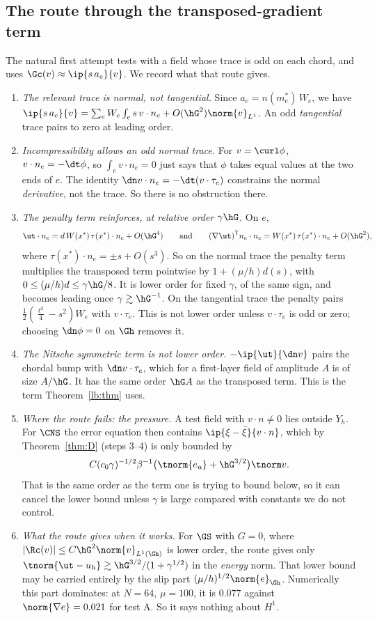 \subsection{The route through the transposed-gradient term}\label{lb:sec:route}
The natural first attempt tests with a field whose trace is odd on each chord, and uses $\Gc(v)\approx\ip{s\,a_e}{v}$. We record what that route gives.
\begin{enumerate}
\item \emph{The relevant trace is normal, not tangential.} Since $a_e=n(m_e^\ast)\,W_e$, we have $\ip{s\,a_e}{v}=\sum_eW_e\int_es\,v\cdot n_e+O(\hG^2)\norm{v}_{L^1}$. An odd \emph{tangential} trace pairs to zero at leading order.
\item \emph{Incompressibility allows an odd normal trace.} For $v=\curl\phi$, $v\cdot n_e=-\dt\phi$, so $\int_ev\cdot n_e=0$ just says that $\phi$ takes equal values at the two ends of $e$. The identity $\dn v\cdot n_e=-\dt(v\cdot\tau_e)$ constrains the normal \emph{derivative}, not the trace. So there is no obstruction there.
\item \emph{The penalty term reinforces, at relative order $\gamma\hG$.} On $e$,
\[
\ut\cdot n_e=d\,W(x^\ast)\,\tau(x^\ast)\cdot n_e+O(\hG^4)
\qquad\text{and}\qquad
(\nabla\ut)^{\mathsf T}n_e\cdot n_e=W(x^\ast)\,\tau(x^\ast)\cdot n_e+O(\hG^2),
\]
where $\tau(x^\ast)\cdot n_e=\pm s+O(s^3)$. So on the normal trace the penalty term multiplies the transposed term pointwise by $1+(\mu/h)d(s)$, with $0\le(\mu/h)d\le\gamma\hG/8$. It is lower order for fixed $\gamma$, of the same sign, and becomes leading once $\gamma\gtrsim\hG^{-1}$. On the tangential trace the penalty pairs $\frac12(\frac{\ell^2}4-s^2)W_e$ with $v\cdot\tau_e$. This is not lower order unless $v\cdot\tau_e$ is odd or zero; choosing $\dn\phi=0$ on $\Gh$ removes it.
\item \emph{The Nitsche symmetric term is \emph{not} lower order.} $-\ip{\ut}{\dn v}$ pairs the chordal bump with $\dn v\cdot\tau_e$, which for a first-layer field of amplitude $A$ is of size $A/\hG$. It has the same order $\hG A$ as the transposed term. This is the term Theorem~\ref{lb:thm} uses.
\item \emph{Where the route fails: the pressure.} A test field with $v\cdot n\neq0$ lies outside $Y_h$. For $\CNS$ the error equation then contains $\ip{\xi-\bar\xi}{v\cdot n}$, which by Theorem~\ref{thm:D} (steps 3--4) is only bounded by
\[
C(c_0\gamma)^{-1/2}\beta^{-1}\bigl(\tnorm{e_u}+\hG^{3/2}\bigr)\tnorm v .
\]
That is the same order as the term one is trying to bound below, so it can cancel the lower bound unless $\gamma$ is large compared with constants we do not control.
\item \emph{What the route gives when it works.} For $\GS$ with $G=0$, where $|\Rc(v)|\le C\hG^2\norm{v}_{L^1(\Gh)}$ is lower order, the route gives only $\tnorm{\ut-u_h}\gtrsim\hG^{3/2}/(1+\gamma^{1/2})$ in the \emph{energy} norm. That lower bound may be carried entirely by the slip part $(\mu/h)^{1/2}\norm{e}_{\Gh}$. Numerically this part dominates: at $N=64$, $\mu=100$, it is $0.077$ against $\norm{\nabla e}=0.021$ for test A. So it says nothing about $H^1$.
\end{enumerate}

